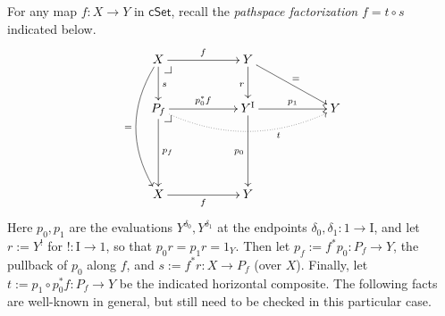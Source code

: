 \documentclass[12pt]{article}
\makeatletter
\newcommand{\cSet}{\ensuremath{\mathsf{cSet}}}
\newcommand{\ra}{\ensuremath{\rightarrow}}
\newcommand{\I}{\ensuremath{\mathrm{I}}}
\theoremstyle{remark}
\theoremstyle{definition}
\newcommand{\pbcorner}[1][dr]{\save*!/#1-1.2pc/#1:(-1,1)@^{|-}\restore}
\makeatother
\begin{document}
For any map $f :X\ra Y$ in $\cSet$, recall the \emph{pathspace factorization} $f = t\circ s$ indicated below.
\begin{equation}\label{diag:pathspace factorization}
\xymatrix{
X \ar@/_1.5pc/[ddd]_= \ar[d]^s \ar[rr]^f \pbcorner && Y \ar[d]_r \ar[rrd]^=\\
P_f  \ar[dd]^{p_f} \ar[rr]^{p_0^*f} \ar@{.>}@/_1.5pc/[rrrr]_<<<<<<<<<<<<<<<t \pbcorner && Y^\I \ar[dd]_{p_0} \ar[rr]^-{p_1} && Y \\
\\
X \ar[rr]_f  &&  Y &
}
\end{equation}
Here $p_0, p_1$ are the evaluations $Y^{\delta_{0}}, Y^{\delta_{1}}$ at the endpoints $\delta_0, \delta_1 : 1\ra\I$, and let $r:= Y^!$ for $! : \I\ra 1$, so that $p_0r = p_1r = 1_Y$.  Then let  $p_f := f^*p_0 : P_f \ra Y$, the pullback of $p_0$ along $f$, and $s:= f^*r : X\ra P_f$ (over $X$).  Finally, let $t:= p_1\circ p_0^*f : P_f \ra Y$ be the indicated horizontal composite. 
The following facts are well-known in general, but still need to be checked in this particular case.
\end{document}
